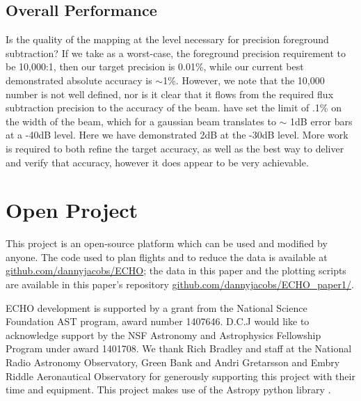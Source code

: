 \documentclass[preprint2,numberedappendix,tighten,twocolappendix]{aastex6}
\begin{document}
\subsection{Overall Performance}
Is the quality of the mapping at the level necessary for precision foreground subtraction?   If we take as a worst-case, the foreground precision requirement to be 10,000:1, then our target precision is 0.01\%, while our current best demonstrated absolute accuracy is $\sim$1\%.  However, we note that the 10,000 number is not well defined, nor is it clear that it flows from the required flux subtraction precision to the accuracy of the beam. \citet{Shaw2015_chimemmodes} have set the limit of .1\% on the width of the beam, which for a gaussian beam translates to $\sim$ 1dB error bars at a -40dB level. Here we have demonstrated 2dB at the -30dB level.  More work is required to both refine the target accuracy, as well as the best way to deliver and verify that accuracy, however it does appear to be very achievable.




\section*{Open Project}
This project is an open-source platform which can be used and modified by anyone. The code used to plan flights and to reduce the data is available at \url{github.com/dannyjacobs/ECHO}; the data in this paper and the plotting scripts are available in this paper's repository \url{github.com/dannyjacobs/ECHO_paper1/}.





\acknowledgments
ECHO development is supported by a grant from the National Science Foundation AST program, award number 1407646. D.C.J would like to acknowledge support by the NSF Astronomy and Astrophysics Fellowship Program under award 1401708.
We thank Rich Bradley and staff at the National Radio Astronomy Observatory, Green Bank and Andri Gretarsson and Embry Riddle Aeronautical Observatory for generously supporting this project with their time and equipment. This project makes use of the Astropy python library \citep{2013Robitaille_Astropy}.



\end{document}
